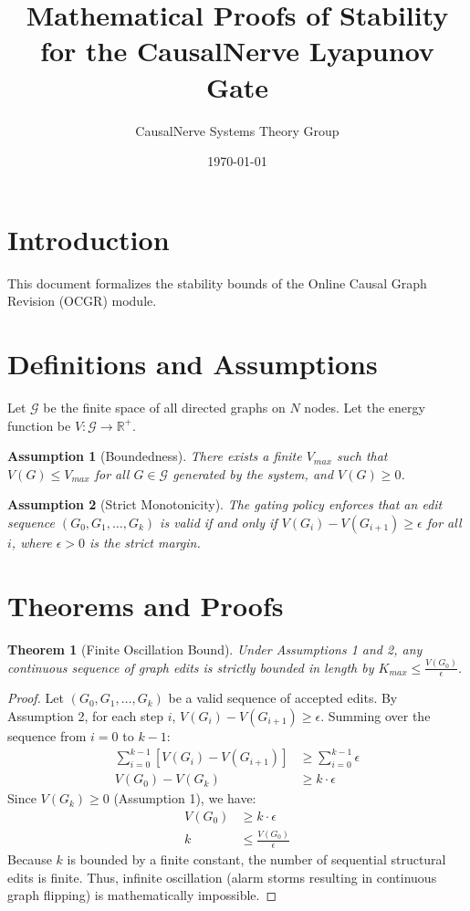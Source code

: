 \documentclass{article}
\title{Mathematical Proofs of Stability for the CausalNerve Lyapunov Gate}
\author{CausalNerve Systems Theory Group}
\date{\today}
\newtheorem{theorem}{Theorem}
\newtheorem{assumption}{Assumption}
\begin{document}
\maketitle

\section{Introduction}
This document formalizes the stability bounds of the Online Causal Graph Revision (OCGR) module.

\section{Definitions and Assumptions}
Let $\mathcal{G}$ be the finite space of all directed graphs on $N$ nodes.
Let the energy function be $V: \mathcal{G} \to \mathbb{R}^+$.

\begin{assumption}[Boundedness]
There exists a finite $V_{max}$ such that $V(G) \le V_{max}$ for all $G \in \mathcal{G}$ generated by the system, and $V(G) \ge 0$.
\end{assumption}

\begin{assumption}[Strict Monotonicity]
The gating policy enforces that an edit sequence $(G_0, G_1, \dots, G_k)$ is valid if and only if $V(G_{i}) - V(G_{i+1}) \ge \epsilon$ for all $i$, where $\epsilon > 0$ is the strict margin.
\end{assumption}

\section{Theorems and Proofs}

\begin{theorem}[Finite Oscillation Bound]
Under Assumptions 1 and 2, any continuous sequence of graph edits is strictly bounded in length by $K_{max} \le \frac{V(G_0)}{\epsilon}$.
\end{theorem}

\begin{proof}
Let $(G_0, G_1, \dots, G_k)$ be a valid sequence of accepted edits. 
By Assumption 2, for each step $i$, $V(G_i) - V(G_{i+1}) \ge \epsilon$.
Summing over the sequence from $i=0$ to $k-1$:
\begin{align*}
\sum_{i=0}^{k-1} [V(G_i) - V(G_{i+1})] &\ge \sum_{i=0}^{k-1} \epsilon \\
V(G_0) - V(G_k) &\ge k \cdot \epsilon
\end{align*}
Since $V(G_k) \ge 0$ (Assumption 1), we have:
\begin{align*}
V(G_0) &\ge k \cdot \epsilon \\
k &\le \frac{V(G_0)}{\epsilon}
\end{align*}
Because $k$ is bounded by a finite constant, the number of sequential structural edits is finite. Thus, infinite oscillation (alarm storms resulting in continuous graph flipping) is mathematically impossible.
\end{proof}
\end{document}
